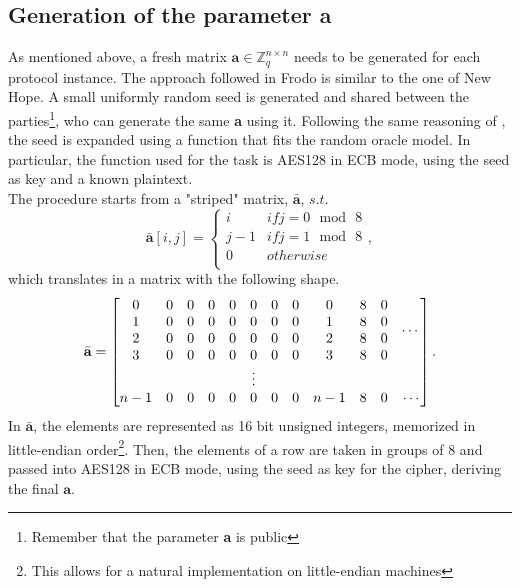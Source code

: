 \subsection{Generation of the parameter \textbf{a}}\label{sec:fr:a_generation}
As mentioned above, a fresh matrix $\textbf{a} \in \mathbb{Z}^{n\times n}_q$ needs to be generated for each protocol instance. The approach followed in Frodo is similar to the one of New Hope. A small uniformly random seed is generated and shared between the parties\footnote{Remember that the parameter \textbf{a} is public}, who can generate the same \textbf{a} using it. Following the same reasoning of \cite{newhope}, the seed is expanded using a function that fits the random oracle model. In particular, the function used for the task is AES128 in ECB mode, using the seed as key and a known plaintext.\\
The procedure starts from a "striped" matrix, $\bar{\textbf{a}}$, $s.t.$ 
\begin{equation*}
\bar{\textbf{a}}[i,j]=
\begin{cases}
i   & if j=0\text{ }\mathrm{mod}\text{ }8    \\
j-1 & if j=1\text{ }\mathrm{mod}\text{ }8    \\
0   & otherwise                              \\
\end{cases},
\end{equation*}
which translates in a matrix with the following shape.
\begin{equation*}
\bar{\textbf{a}}=
\setcounter{MaxMatrixCols}{12}
\begin{bmatrix}
0  & 0 & 0 & 0 & 0 & 0 & 0 & 0 & 0 & 8 & 0 & \multirow{4}{*}{$\cdots$}     \\
1  & 0 & 0 & 0 & 0 & 0 & 0 & 0 & 1 & 8 & 0 & \\
2  & 0 & 0 & 0 & 0 & 0 & 0 & 0 & 2 & 8 & 0 & \\
3  & 0 & 0 & 0 & 0 & 0 & 0 & 0 & 3 & 8 & 0 & \\
\multicolumn{11}{c}{\vdots}              & \\
n-1& 0 & 0 & 0 & 0 & 0 & 0 & 0 &n-1& 8 & 0 & \cdots \\
\end{bmatrix}.
\end{equation*}
In $\bar{\textbf{a}}$, the elements are represented as 16 bit unsigned integers, memorized in little-endian order\footnote{This allows for a natural implementation on little-endian machines}. Then, the elements of a row are taken in groups of 8 and passed into AES128 in ECB mode, using the seed as key for the cipher, deriving the final $\textbf{a}$.
